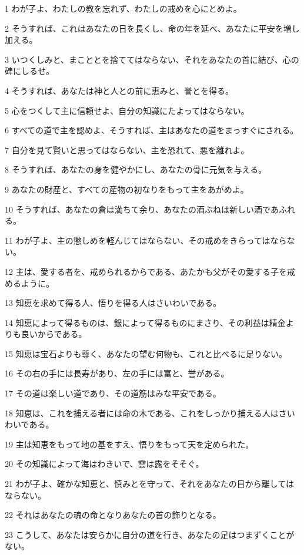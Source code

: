 \par 1 わが子よ、わたしの教を忘れず、わたしの戒めを心にとめよ。
\par 2 そうすれば、これはあなたの日を長くし、命の年を延べ、あなたに平安を増し加える。
\par 3 いつくしみと、まこととを捨ててはならない、それをあなたの首に結び、心の碑にしるせ。
\par 4 そうすれば、あなたは神と人との前に恵みと、誉とを得る。
\par 5 心をつくして主に信頼せよ、自分の知識にたよってはならない。
\par 6 すべての道で主を認めよ、そうすれば、主はあなたの道をまっすぐにされる。
\par 7 自分を見て賢いと思ってはならない、主を恐れて、悪を離れよ。
\par 8 そうすれば、あなたの身を健やかにし、あなたの骨に元気を与える。
\par 9 あなたの財産と、すべての産物の初なりをもって主をあがめよ。
\par 10 そうすれば、あなたの倉は満ちて余り、あなたの酒ぶねは新しい酒であふれる。
\par 11 わが子よ、主の懲しめを軽んじてはならない、その戒めをきらってはならない。
\par 12 主は、愛する者を、戒められるからである、あたかも父がその愛する子を戒めるように。
\par 13 知恵を求めて得る人、悟りを得る人はさいわいである。
\par 14 知恵によって得るものは、銀によって得るものにまさり、その利益は精金よりも良いからである。
\par 15 知恵は宝石よりも尊く、あなたの望む何物も、これと比べるに足りない。
\par 16 その右の手には長寿があり、左の手には富と、誉がある。
\par 17 その道は楽しい道であり、その道筋はみな平安である。
\par 18 知恵は、これを捕える者には命の木である、これをしっかり捕える人はさいわいである。
\par 19 主は知恵をもって地の基をすえ、悟りをもって天を定められた。
\par 20 その知識によって海はわきいで、雲は露をそそぐ。
\par 21 わが子よ、確かな知恵と、慎みとを守って、それをあなたの目から離してはならない。
\par 22 それはあなたの魂の命となりあなたの首の飾りとなる。
\par 23 こうして、あなたは安らかに自分の道を行き、あなたの足はつまずくことがない。
